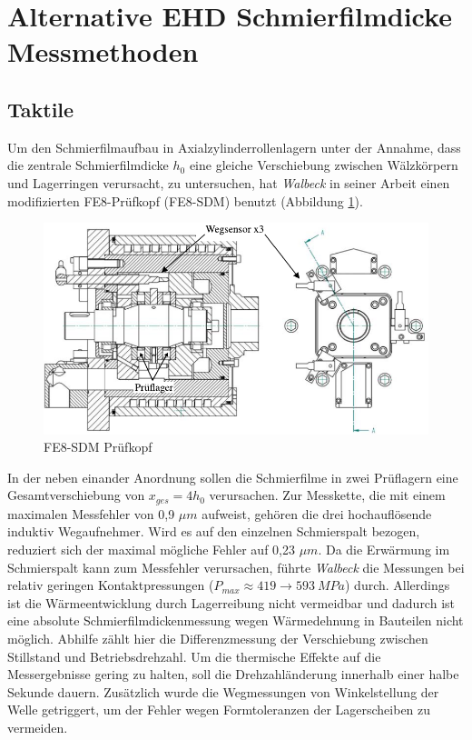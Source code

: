 \section{Alternative EHD Schmierfilmdicke Messmethoden}
\label{sec:alternative_messmethoden}

\subsection{Taktile}
\label{sub:taktil}

Um den Schmierfilmaufbau in Axialzylinderrollenlagern unter der Annahme, dass die zentrale Schmierfilmdicke $h_0$ eine gleiche Verschiebung zwischen Wälzkörpern und Lagerringen verursacht, zu untersuchen, hat \textit{Walbeck} in seiner Arbeit \cite{Walbeck_2004} einen modifizierten FE8-Prüfkopf (FE8-SDM) benutzt (Abbildung \ref{fig:fe8_sdm_walbeck}).
\begin{figure}[htb]
    \centering
    \includegraphics[]{./images/fe8_sdm_walbeck.pdf}
    \caption{FE8-SDM Prüfkopf \cite{Walbeck_2004}}
    \label{fig:fe8_sdm_walbeck}
\end{figure}
%

In der neben einander Anordnung sollen die Schmierfilme in zwei Prüflagern eine Gesamtverschiebung von $x_{ges} = 4 h_0$ verursachen.
Zur Messkette, die mit einem maximalen Messfehler von 0,9 $\mu m$ aufweist, gehören die drei hochauflösende induktiv Wegaufnehmer.
Wird es auf den einzelnen Schmierspalt bezogen, reduziert sich der maximal mögliche Fehler auf 0,23 $\mu m$.
Da die Erwärmung im Schmierspalt kann zum Messfehler verursachen, führte \textit{Walbeck} die Messungen bei relativ geringen Kontaktpressungen ($P_{max} \approx 419 \rightarrow 593 \ MPa$) durch.
Allerdings ist die Wärmeentwicklung durch Lagerreibung nicht vermeidbar und dadurch ist eine absolute Schmierfilmdickenmessung wegen Wärmedehnung in Bauteilen nicht möglich.
Abhilfe zählt hier die Differenzmessung der Verschiebung zwischen Stillstand und Betriebsdrehzahl.
Um die thermische Effekte auf die Messergebnisse gering zu halten, soll die Drehzahländerung innerhalb einer halbe Sekunde dauern.
Zusätzlich wurde die Wegmessungen von Winkelstellung der Welle getriggert, um der Fehler wegen Formtoleranzen der Lagerscheiben zu vermeiden.

